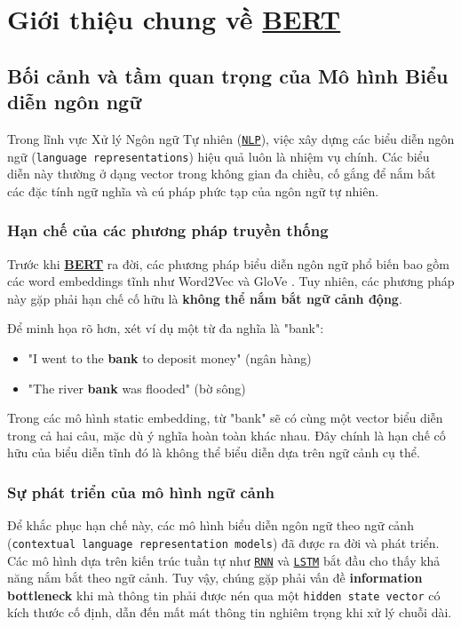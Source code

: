 \section{Giới thiệu chung về \hyperref[acro:bert]{\textbf{BERT}}}
\label{sec:gioi_thieu_chung_bert}

\subsection{Bối cảnh và tầm quan trọng của Mô hình Biểu diễn ngôn ngữ}
\label{ssec:boi_canh_bieu_dien_ngon_ngu}

Trong lĩnh vực Xử lý Ngôn ngữ Tự nhiên (\hyperref[acro:nlp]{\texttt{NLP}}), việc xây dựng các biểu diễn ngôn ngữ (\texttt{language representations}) hiệu quả luôn là nhiệm vụ chính. Các biểu diễn này thường ở dạng vector trong không gian đa chiều, cố gắng để nắm bắt các đặc tính ngữ nghĩa và cú pháp phức tạp của ngôn ngữ tự nhiên.

\subsubsection{Hạn chế của các phương pháp truyền thống}
Trước khi \hyperref[acro:bert]{\textbf{BERT}} ra đời, các phương pháp biểu diễn ngôn ngữ phổ biến bao gồm các word embeddings tĩnh như Word2Vec \cite{mikolov2013distributed} và GloVe \cite{pennington2014glove}. Tuy nhiên, các phương pháp này gặp phải hạn chế cố hữu là \textbf{không thể nắm bắt ngữ cảnh động}.

Để minh họa rõ hơn, xét ví dụ một từ đa nghĩa là "bank":
\begin{itemize}
    \item "I went to the \textbf{bank} to deposit money" (ngân hàng)
    \item "The river \textbf{bank} was flooded" (bờ sông)
\end{itemize}

Trong các mô hình static embedding, từ "bank" sẽ có cùng một vector biểu diễn trong cả hai câu, mặc dù ý nghĩa hoàn toàn khác nhau. Đây chính là hạn chế cố hữu của biểu diễn tĩnh đó là không thể biểu diễn dựa trên ngữ cảnh cụ thể.

\subsubsection{Sự phát triển của mô hình ngữ cảnh}
Để khắc phục hạn chế này, các mô hình biểu diễn ngôn ngữ theo ngữ cảnh (\texttt{contextual language representation models}) đã được ra đời và phát triển. Các mô hình dựa trên kiến trúc tuần tự như \hyperref[acro:rnn]{\texttt{RNN}} và \hyperref[acro:lstm]{\texttt{LSTM}} bắt đầu cho thấy khả năng nắm bắt theo ngữ cảnh. Tuy vậy, chúng gặp phải vấn đề \textbf{information bottleneck} khi mà thông tin phải được nén qua một \texttt{hidden state vector} có kích thước cố định, dẫn đến mất mát thông tin nghiêm trọng khi xử lý chuỗi dài.

